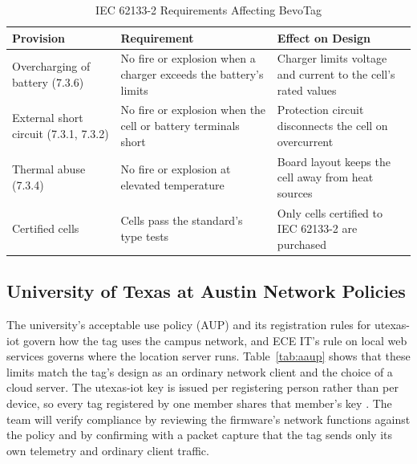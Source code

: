 \documentclass[12pt,letterpaper]{article}
\newenvironment{spectable}{\setstretch{1.0}\renewcommand{\arraystretch}{1.1}}{}
\begin{document}
\begin{table}[H]
\caption{IEC 62133-2 Requirements Affecting BevoTag}
\label{tab:aiec}
\centering
\begin{spectable}
\begin{tabularx}{\linewidth}{@{}L{1.7in} Y Y@{}}
\toprule
\textbf{Provision} & \textbf{Requirement} & \textbf{Effect on Design} \\
\midrule
Overcharging of battery (7.3.6) & No fire or explosion when a charger exceeds the battery's limits & Charger limits voltage and current to the cell's rated values \\
External short circuit (7.3.1, 7.3.2) & No fire or explosion when the cell or battery terminals short & Protection circuit disconnects the cell on overcurrent \\
Thermal abuse (7.3.4) & No fire or explosion at elevated temperature & Board layout keeps the cell away from heat sources \\
Certified cells & Cells pass the standard's type tests & Only cells certified to IEC 62133-2 are purchased \\
\bottomrule
\end{tabularx}
\end{spectable}
\end{table}

\subsection*{University of Texas at Austin Network Policies}
The university's acceptable use policy (AUP) \cite{utaup} and its registration rules for utexas-iot
\cite{utiot} govern how the tag uses the campus network, and ECE IT's rule on local web services
\cite{eceweb} governs where the location server runs. Table~\ref{tab:aaup} shows that these limits
match the tag's design as an ordinary network client and the choice of a cloud server. The utexas-iot
key is issued per registering person rather than per device, so every tag registered by one member
shares that member's key \cite{utiot}. The team will verify compliance by reviewing the firmware's
network functions against the policy and by confirming with a packet capture that the tag sends only
its own telemetry and ordinary client traffic.
\end{document}
